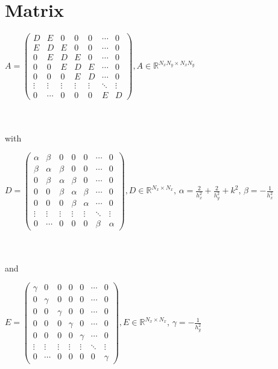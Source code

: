 \section{Matrix}

$A =
 \left. \begin{pmatrix}
  	D 		& E 		& 0 		& 0 		& 0 		& \cdots 		& 0 \\
  	E 		& D 		& E 		& 0 		& 0 		& \cdots 		& 0 \\
	0 		& E 		& D 		& E 		& 0 		& \cdots 		& 0 \\
	0 		& 0 		& E 		& D 		& E 		& \cdots 		& 0 \\
	0 		& 0 		& 0 		& E 		& D 		& \cdots 		& 0 \\
  	\vdots  	& \vdots  	& \vdots 	& \vdots 	& \vdots  	& \ddots 		& \vdots\\
  	0 		& \cdots 	& 0 		& 0 		& 0		& E 			& D
 \end{pmatrix}
\right. \text{$, A \in \mathbb{R}^{N_{x}N_{y} \times N_{x}N_{y}}$}$

\hfill \\
\hfill \\
with \newline
\newline

$D =
\left. \begin{pmatrix}
	\alpha		& \beta	& 0 		& 0 		& 0 		& \cdots 		& 0 \\
  	\beta 		& \alpha	& \beta	& 0 		& 0 		& \cdots 		& 0 \\
	0 		& \beta	& \alpha	& \beta	& 0 		& \cdots 		& 0 \\
	0 		& 0 		& \beta	& \alpha	& \beta	& \cdots 		& 0 \\
	0 		& 0 		& 0 		& \beta	& \alpha	& \cdots 		& 0 \\
  	\vdots  	& \vdots  	& \vdots 	& \vdots 	& \vdots  	& \ddots 		& \vdots\\
  	0 		& \cdots 	& 0 		& 0 		& 0		& \beta		& \alpha
\end{pmatrix}
\right. \text{$, D \in \mathbb{R}^{N_{x} \times N_{x}}$, $\alpha = \frac{2}{h_{x}^{2}} + \frac{2}{h_{y}^{2}} + k^{2}$, $\beta = - \frac{1}{h_{x}^{2}}$}$

\hfill \\
\hfill \\
and\newline
\newline

$E =
\left. \begin{pmatrix}
	\gamma	& 0		& 0 		& 0 		& 0 		& \cdots 		& 0 \\
  	0		& \gamma	& 0 		& 0 		& 0 		& \cdots 		& 0 \\
	0 		& 0 		& \gamma	& 0		& 0 		& \cdots 		& 0 \\
	0 		& 0 		& 0 		& \gamma	& 0 		& \cdots 		& 0 \\
	0 		& 0 		& 0 		& 0 		& \gamma	& \cdots 		& 0 \\
  	\vdots  	& \vdots  	& \vdots 	& \vdots 	& \vdots  	& \ddots 		& \vdots\\
  	0 		& \cdots 	& 0 		& 0 		& 0		& 0 			& \gamma
\end{pmatrix}
\right. \text{$, E \in \mathbb{R}^{N_{x} \times N_{x}}$, $\gamma = - \frac{1}{h_{y}^{2}}$}$


